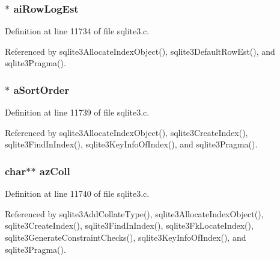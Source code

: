 \hypertarget{struct_index_aab6ba3928ad4eefe19dbf7639b25ad44}{}
\subsubsection[{ai\+Row\+Log\+Est}]{$\ast$ ai\+Row\+Log\+Est}\label{struct_index_aab6ba3928ad4eefe19dbf7639b25ad44}


Definition at line 11734 of file sqlite3.\+c.



Referenced by sqlite3\+Allocate\+Index\+Object(), sqlite3\+Default\+Row\+Est(), and sqlite3\+Pragma().

\hypertarget{struct_index_ace4725075c963b97eb9a9a0db1be905b}{}
\subsubsection[{a\+Sort\+Order}]{$\ast$ a\+Sort\+Order}\label{struct_index_ace4725075c963b97eb9a9a0db1be905b}


Definition at line 11739 of file sqlite3.\+c.



Referenced by sqlite3\+Allocate\+Index\+Object(), sqlite3\+Create\+Index(), sqlite3\+Find\+In\+Index(), sqlite3\+Key\+Info\+Of\+Index(), and sqlite3\+Pragma().

\hypertarget{struct_index_a7433f80ab83ca3f61a37ab747e351a3a}{}
\subsubsection[{az\+Coll}]{\setlength{\rightskip}{0pt plus 5cm}char$\ast$$\ast$ az\+Coll}\label{struct_index_a7433f80ab83ca3f61a37ab747e351a3a}


Definition at line 11740 of file sqlite3.\+c.



Referenced by sqlite3\+Add\+Collate\+Type(), sqlite3\+Allocate\+Index\+Object(), sqlite3\+Create\+Index(), sqlite3\+Find\+In\+Index(), sqlite3\+Fk\+Locate\+Index(), sqlite3\+Generate\+Constraint\+Checks(), sqlite3\+Key\+Info\+Of\+Index(), and sqlite3\+Pragma().

